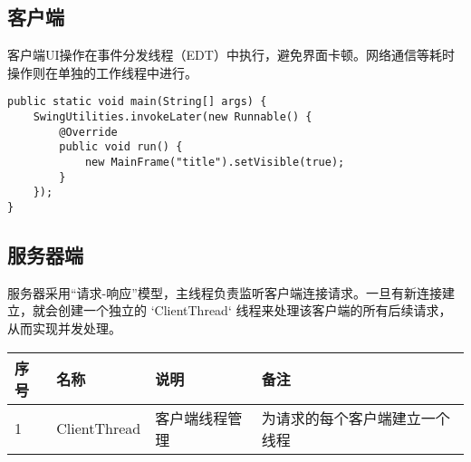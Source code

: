 \documentclass[a4paper]{ctexart}
\begin{document}
\subsection{客户端}
客户端UI操作在事件分发线程（EDT）中执行，避免界面卡顿。网络通信等耗时操作则在单独的工作线程中进行。
\begin{lstlisting}
public static void main(String[] args) {
    SwingUtilities.invokeLater(new Runnable() {
        @Override
        public void run() {
            new MainFrame("title").setVisible(true);
        }
    });
}
\end{lstlisting}

\subsection{服务器端}
服务器采用“请求-响应”模型，主线程负责监听客户端连接请求。一旦有新连接建立，就会创建一个独立的 `ClientThread` 线程来处理该客户端的所有后续请求，从而实现并发处理。

\begin{tabular}{llll}
    \toprule
    \textbf{序号} & \textbf{名称}  & \textbf{说明} & \textbf{备注}     \\
    \midrule
    1           & ClientThread & 客户端线程管理     & 为请求的每个客户端建立一个线程 \\
    \bottomrule
\end{tabular}
\end{document}
